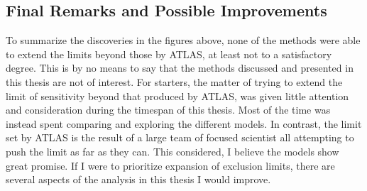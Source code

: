 \subsection*{Final Remarks and Possible Improvements}
To summarize the discoveries in the figures above, none of the methods were able to extend the limits beyond those by \ac{ATLAS}, at least not to a satisfactory degree.
This is by no means to say that the methods discussed and presented in this thesis are not of interest. For starters, the matter of trying to extend the limit of sensitivity 
beyond that produced by \ac{ATLAS}, was given little attention and consideration during the timespan of this thesis. Most of the time was instead spent comparing and exploring the 
different models. In contrast, the limit set by \ac{ATLAS} is the result of a large team of focused scientist all attempting to push the limit as far as they can. This considered, I believe 
the models show great promise. If I were to prioritize expansion of exclusion limits, there are several aspects of the analysis in this thesis I would improve.
